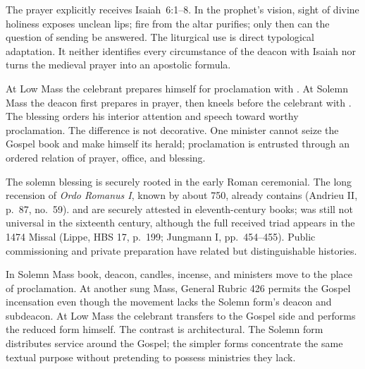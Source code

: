 
The prayer  explicitly receives Isaiah~6:1--8. In the prophet's vision, sight of divine holiness exposes unclean lips; fire from the altar purifies; only then can the question of sending be answered. The liturgical use is direct typological adaptation. It neither identifies every circumstance of the deacon with Isaiah nor turns the medieval prayer into an apostolic formula.

At Low Mass the celebrant prepares himself for proclamation with . At Solemn Mass the deacon first prepares in prayer, then kneels before the celebrant with . The blessing orders his interior attention and speech toward worthy proclamation. The difference is not decorative. One minister cannot seize the Gospel book and make himself its herald; proclamation is entrusted through an ordered relation of prayer, office, and blessing.

The solemn blessing is securely rooted in the early Roman ceremonial. The long recension of \emph{Ordo Romanus I}, known by about 750, already contains  (Andrieu II, p.~87, no.~59).  and  are securely attested in eleventh-century books;  was still not universal in the sixteenth century, although the full received triad appears in the 1474 Missal (Lippe, HBS 17, p.~199; Jungmann I, pp.~454--455). Public commissioning and private preparation have related but distinguishable histories.


In Solemn Mass book, deacon, candles, incense, and ministers move to the place of proclamation. At another sung Mass, General Rubric 426 permits the Gospel incensation even though the movement lacks the Solemn form's deacon and subdeacon. At Low Mass the celebrant transfers to the Gospel side and performs the reduced form himself. The contrast is architectural. The Solemn form distributes service around the Gospel; the simpler forms concentrate the same textual purpose without pretending to possess ministries they lack.

